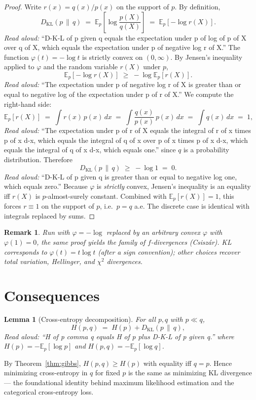 \documentclass[11pt]{article}
\newtheorem{lemma}[theorem]{Lemma}
\newtheorem{remark}[theorem]{Remark}
\begin{document}
\begin{proof}
Write $r(x) = q(x) / p(x)$ on the support of $p$. By definition,
\[
D_{\mathrm{KL}}(p \,\|\, q) \;=\; \mathbb{E}_{p}\!\left[\log \frac{p(X)}{q(X)}\right] \;=\; \mathbb{E}_{p}\!\left[-\log r(X)\right].
\]
\emph{Read aloud:} ``D-K-L of p given q equals the expectation under p of log of p of X over q of X, which equals the expectation under p of negative log r of X.''
The function $\varphi(t) = -\log t$ is strictly convex on $(0, \infty)$. By Jensen's inequality applied to $\varphi$ and the random variable $r(X)$ under $p$,
\[
\mathbb{E}_{p}\!\left[-\log r(X)\right] \;\ge\; -\log \mathbb{E}_{p}\!\left[r(X)\right].
\]
\emph{Read aloud:} ``The expectation under p of negative log r of X is greater than or equal to negative log of the expectation under p of r of X.''
We compute the right-hand side:
\[
\mathbb{E}_{p}\!\left[r(X)\right] \;=\; \int r(x) \, p(x) \, dx \;=\; \int \frac{q(x)}{p(x)} \, p(x) \, dx \;=\; \int q(x) \, dx \;=\; 1,
\]
\emph{Read aloud:} ``The expectation under p of r of X equals the integral of r of x times p of x d-x, which equals the integral of q of x over p of x times p of x d-x, which equals the integral of q of x d-x, which equals one.''
since $q$ is a probability distribution. Therefore
\[
D_{\mathrm{KL}}(p \,\|\, q) \;\ge\; -\log 1 \;=\; 0.
\]
\emph{Read aloud:} ``D-K-L of p given q is greater than or equal to negative log one, which equals zero.''
Because $\varphi$ is \emph{strictly} convex, Jensen's inequality is an equality iff $r(X)$ is $p$-almost-surely constant. Combined with $\mathbb{E}_p[r(X)] = 1$, this forces $r \equiv 1$ on the support of $p$, i.e.\ $p = q$ a.e. The discrete case is identical with integrals replaced by sums.
\end{proof}

\begin{remark}
Run with $\varphi = -\log$ replaced by an arbitrary convex $\varphi$ with $\varphi(1) = 0$, the same proof yields the family of \emph{$f$-divergences} (Csisz\'ar). KL corresponds to $\varphi(t) = t \log t$ (after a sign convention); other choices recover total variation, Hellinger, and $\chi^2$ divergences.
\end{remark}

\section{Consequences}

\begin{lemma}[Cross-entropy decomposition]
For all $p, q$ with $p \ll q$,
\[
H(p, q) \;=\; H(p) + D_{\mathrm{KL}}(p \,\|\, q),
\]
\emph{Read aloud:} ``H of p comma q equals H of p plus D-K-L of p given q.''
where $H(p) = -\mathbb{E}_p[\log p]$ and $H(p, q) = -\mathbb{E}_p[\log q]$.
\end{lemma}

By Theorem~\ref{thm:gibbs}, $H(p, q) \ge H(p)$ with equality iff $q = p$. Hence minimizing cross-entropy in $q$ for fixed $p$ is the same as minimizing KL divergence --- the foundational identity behind maximum likelihood estimation and the categorical cross-entropy loss.
\end{document}
